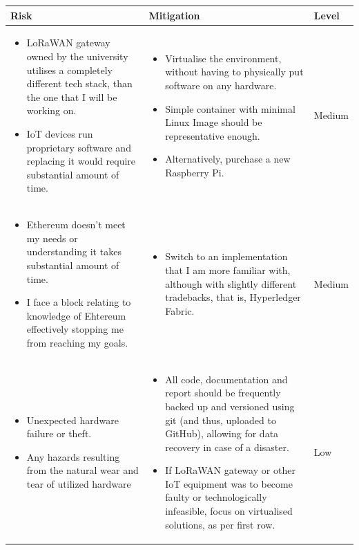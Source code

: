 \documentclass[a4paper,12pt]{article}
\begin{document}
\bgroup
\def\arraystretch{2}
\begin{table}[H]
\centering
\begin{tabular}{|m{}|m{}|m{}|}
\hline
\textbf{Risk} & \textbf{Mitigation}                       & \textbf{Level} \\ \hline
\begin{itemize}[leftmargin=*]
  \item LoRaWAN gateway owned by the university utilises a completely different tech stack, than the one that I will be working on.
  \item IoT devices run proprietary software and replacing it would require substantial amount of time.
\end{itemize} &
\begin{itemize}[leftmargin=*]
  \item Virtualise the environment, without having to physically put software on any hardware.
  \item Simple container with minimal Linux Image should be representative enough.
  \item Alternatively, purchase a new Raspberry Pi.
\end{itemize} &
Medium \\ \hline
\begin{itemize}[leftmargin=*]
  \item Ethereum doesn't meet my needs or understanding it takes substantial amount of time.
  \item I face a block relating to knowledge of Ehtereum effectively stopping me from reaching my goals.
\end{itemize} &
\begin{itemize}[leftmargin=*]
  \item Switch to an implementation that I am more familiar with, although with slightly different tradebacks, that is, Hyperledger Fabric.
\end{itemize} &
Medium \\ \hline
\begin{itemize}[leftmargin=*]
  \item Unexpected hardware failure or theft.
  \item Any hazards resulting from the natural wear and tear of utilized hardware
\end{itemize} &
\begin{itemize}[leftmargin=*]
  \item All code, documentation and report should be frequently backed up and versioned using git (and thus, uploaded to GitHub), allowing for data recovery in case of a disaster.
  \item If LoRaWAN gateway or other IoT equipment was to become faulty or technologically infeasible, focus on virtualised solutions, as per first row.
\end{itemize} &
Low \\ \hline
\end{tabular}
\end{table}
\egroup
\pagebreak
\end{document}
